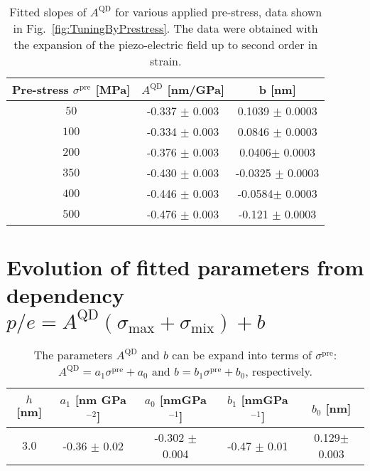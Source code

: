  		\begin{table}[ht!]
 			\centering
 			\caption{Fitted slopes of $A^{\mathrm{QD}}$ for various applied pre-stress, data shown in Fig.~\ref{fig:TuningByPrestress}. The data were obtained with the expansion of the piezo-electric field up to second order in strain.}
 			\label{tab:prestress_slopes}
 			\begin{tabular}{|c|c|c|}
 				\hline
 				Pre-stress $\sigma^\mathrm{pre}$ [MPa]		& $A^{\mathrm{QD}}$ [nm/GPa]    & b   [nm]    \\ \hline
 				$50$  &-0.337 $\pm$ 0.003  & 0.1039 $\pm$ 0.0003     \\ \hline
 				$100$	&-0.334 $\pm$ 0.003  & 0.0846 $\pm$ 0.0003      \\ \hline
 				$200$  &-0.376 $\pm$ 0.003  & 0.0406$\pm$ 0.0003     \\ \hline
 				$350$	&-0.430 $\pm$ 0.003  & -0.0325 $\pm$ 0.0003      \\ \hline
 				$400$  &-0.446 $\pm$ 0.003  & -0.0584$\pm$ 0.0003    \\ \hline
 				$500$	&-0.476 $\pm$ 0.003  & -0.121 $\pm$ 0.0003      \\ \hline
 			\end{tabular}    
 		\end{table}
 		
\newpage
\section*{Evolution of fitted parameters from dependency $p/e = A^\mathrm{QD} \left(\sigma_\mathrm{max}+\sigma_\mathrm{mix}\right) + b$}
%
\label{app:empirical_model}

 		
 		\begin{table}[ht!]
 			\centering
 			\caption{The parameters $A^\mathrm{QD}$ and $b$ can be expand into terms of $\sigma^\mathrm{pre}$: $A^\mathrm{QD}=a_1\sigma^\mathrm{pre}+a_0$ and $b=b_1\sigma^\mathrm{pre}+b_0$, respectively.}
 			\label{tab:prestress_fit}
 			\begin{tabular}{|c|c|c||c|c|}
 				\hline
 				$h$ [nm]		   & $a_1$   [nm GPa$^{-2}$]  &$a_0$ [nmGPa$^{-1}$] & $b_1$ [nmGPa$^{-1}$] & $b_0$ [nm] \\ \hline
 			$3.0$   & -0.36 $\pm$ 0.02  &  -0.302 $\pm$ 0.004 & -0.47 $\pm$ 0.01 & 0.129$\pm$0.003 \\ \hline %
 			\end{tabular}    
 		\end{table}
 		

